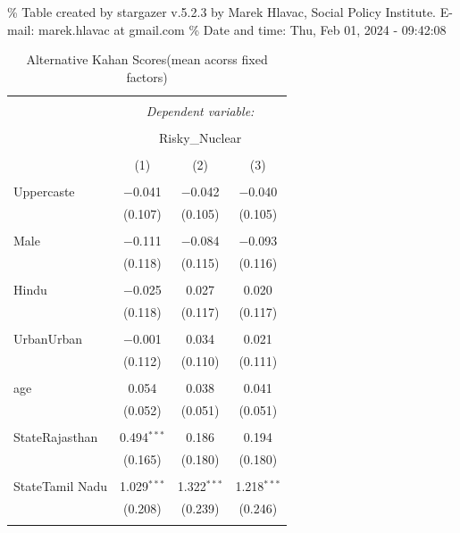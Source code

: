 \documentclass[
]{article}
\begin{document}
\begingroup\setlength{\tabcolsep}{1pt}

\renewcommand{\arraystretch}{0.7}

\% Table created by stargazer v.5.2.3 by Marek Hlavac, Social Policy
Institute. E-mail: marek.hlavac at gmail.com \% Date and time: Thu, Feb
01, 2024 - 09:42:08

\begin{table}[!htbp] \centering 
  \caption{Alternative Kahan Scores(mean acorss fixed factors)} 
  \label{} 
\begin{tabular}{@{\extracolsep{5pt}}lccc} 
\\[-1.8ex]\hline 
\hline \\[-1.8ex] 
 & \multicolumn{3}{c}{\textit{Dependent variable:}} \\ 
\cline{2-4} 
\\[-1.8ex] & \multicolumn{3}{c}{Risky\_Nuclear} \\ 
\\[-1.8ex] & (1) & (2) & (3)\\ 
\hline \\[-1.8ex] 
 Uppercaste & $-$0.041 & $-$0.042 & $-$0.040 \\ 
  & (0.107) & (0.105) & (0.105) \\ 
  & & & \\ 
 Male & $-$0.111 & $-$0.084 & $-$0.093 \\ 
  & (0.118) & (0.115) & (0.116) \\ 
  & & & \\ 
 Hindu & $-$0.025 & 0.027 & 0.020 \\ 
  & (0.118) & (0.117) & (0.117) \\ 
  & & & \\ 
 UrbanUrban & $-$0.001 & 0.034 & 0.021 \\ 
  & (0.112) & (0.110) & (0.111) \\ 
  & & & \\ 
 age & 0.054 & 0.038 & 0.041 \\ 
  & (0.052) & (0.051) & (0.051) \\ 
  & & & \\ 
 StateRajasthan & 0.494$^{***}$ & 0.186 & 0.194 \\ 
  & (0.165) & (0.180) & (0.180) \\ 
  & & & \\ 
 StateTamil Nadu & 1.029$^{***}$ & 1.322$^{***}$ & 1.218$^{***}$ \\ 
  & (0.208) & (0.239) & (0.246) \\ 
  & & & \\ 

\end{tabular}
\end{table}
\end{document}
